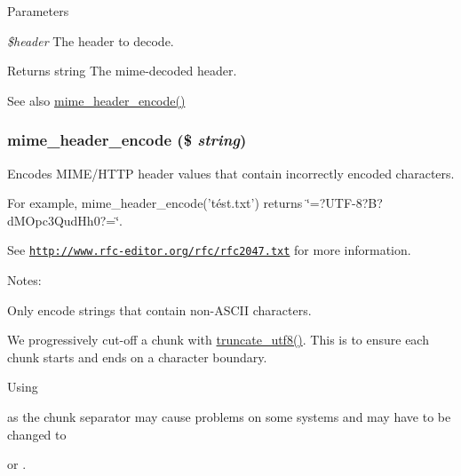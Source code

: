 \begin{DoxyParams}{Parameters}
\item[{\em \$header}]The header to decode.\end{DoxyParams}
\begin{DoxyReturn}{Returns}
string The mime-\/decoded header.
\end{DoxyReturn}
\begin{DoxySeeAlso}{See also}
\hyperlink{unicode_8inc_a079be0dce19618c9dfe392741e6af083}{mime\_\-header\_\-encode()} 
\end{DoxySeeAlso}
\hypertarget{unicode_8inc_a079be0dce19618c9dfe392741e6af083}{
\subsubsection[{mime\_\-header\_\-encode}]{\setlength{\rightskip}{0pt plus 5cm}mime\_\-header\_\-encode (\$ {\em string})}}
\label{unicode_8inc_a079be0dce19618c9dfe392741e6af083}
Encodes MIME/HTTP header values that contain incorrectly encoded characters.

For example, mime\_\-header\_\-encode('tést.txt') returns \char`\"{}=?UTF-\/8?B?dMOpc3QudHh0?=\char`\"{}.

See \href{http://www.rfc-editor.org/rfc/rfc2047.txt}{\tt http://www.rfc-\/editor.org/rfc/rfc2047.txt} for more information.

Notes:
\begin{DoxyItemize}
\item Only encode strings that contain non-\/ASCII characters.
\item We progressively cut-\/off a chunk with \hyperlink{unicode_8inc_aadfc295e976cb61cb8e4f1f1cf0c781e}{truncate\_\-utf8()}. This is to ensure each chunk starts and ends on a character boundary.
\item Using \par
 as the chunk separator may cause problems on some systems and may have to be changed to \par
 or .
\end{DoxyItemize}


